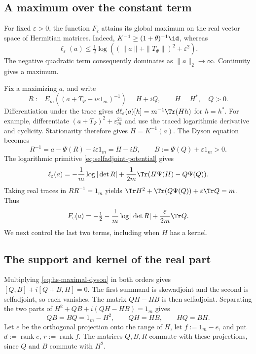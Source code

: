 \subsection{A maximum over the constant term}
For fixed $\varepsilon>0$, the function $F_\varepsilon$ attains its global maximum on the real vector space of Hermitian matrices.
Indeed, $K^{-1}\ge(1+\theta)^{-1}\id$, whereas
\[
 \ell_\varepsilon(a)\le\tfrac12
       \log((\|a\|+\|T_\Psi\|)^2+\varepsilon^2).
\]
The negative quadratic term consequently dominates as $\|a\|_2\to\infty$.
Continuity gives a maximum.

Fix a maximizing $a$, and write
\[
 R:=E_m((a+T_\Psi-i\varepsilon1_m)^{-1})=H+iQ,
 \qquad H=H^*,\quad Q>0.
\]
Differentiation under the trace gives $d\ell_\varepsilon(a)[h]=m^{-1}\Tr(Hh)$ for $h=h^*$.
For example, differentiate $(a+T_\Psi)^2+\varepsilon^21_m$ and use the traced logarithmic derivative and cyclicity.
Stationarity therefore gives $H=K^{-1}(a)$.
The Dyson equation becomes
\begin{equation}\label{eq:hs-maximal-dyson}
 R^{-1}=a-\Psi(R)-i\varepsilon1_m=H-iB,
 \qquad B:=\Psi(Q)+\varepsilon1_m>0.
\end{equation}
The logarithmic primitive \eqref{eq:selfadjoint-potential} gives
\[
 \ell_\varepsilon(a)=-\frac1m\log|\det R|
       +\frac1{2m}\Tr(H\Psi(H)-Q\Psi(Q)).
\]
Taking real traces in $RR^{-1}=1_m$ yields $\Tr H^2+\Tr(Q\Psi(Q))+\varepsilon\Tr Q=m$.
Thus
\begin{equation}\label{eq:hs-maximal-value}
 F_\varepsilon(a)=-\tfrac12-\frac1m\log|\det R|
                         +\frac{\varepsilon}{2m}\Tr Q.
\end{equation}
We next control the last two terms, including when $H$ has a kernel.

\subsection{The support and kernel of the real part}
Multiplying \eqref{eq:hs-maximal-dyson} in both orders gives $[Q,B]+i[Q+B,H]=0$.
The first summand is skewadjoint and the second is selfadjoint, so each vanishes.
The matrix $QH-HB$ is then selfadjoint.
Separating the two parts of $H^2+QB+i(QH-HB)=1_m$ gives
\begin{equation}\label{eq:hs-support-identities}
 QB=BQ=1_m-H^2,\qquad QH=HB,\qquad HQ=BH.
\end{equation}
Let $e$ be the orthogonal projection onto the range of $H$, let $f:=1_m-e$, and put $d:=\operatorname{rank}e$, $r:=\operatorname{rank}f$.
The matrices $Q,B,R$ commute with these projections, since $Q$ and $B$ commute with $H^2$.


